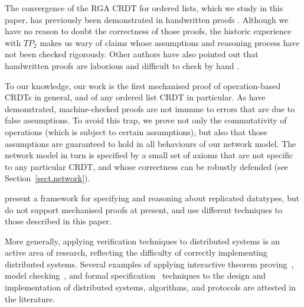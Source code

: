 The convergence of the RGA CRDT for ordered lists, which we study in this paper, has previously been
demonstrated in handwritten proofs \cite{Attiya:2016kh,Kleppmann:2016ve,Roh:2009ws}. Although we
have no reason to doubt the correctness of those proofs, the historic experience with
$\mathit{TP}_2$ makes us wary of claims whose assumptions and reasoning process have not been
checked rigorously. Other authors have also pointed out that handwritten proofs are laborious and
difficult to check by hand \cite{Li:2008hw,Li:2005jq}.

To our knowledge, our work is the first mechanised proof of operation-based CRDTs in general, and of
any ordered list CRDT in particular. As \citet{Oster:2005vi} have demonstrated, machine-checked
proofs are not immune to errors that are due to false assumptions. To avoid this trap, we prove not
only the commutativity of operations (which is subject to certain assumptions), but also that those
assumptions are guaranteed to hold in all behaviours of our network model. The network model in turn
is specified by a small set of axioms that are not specific to any particular CRDT, and whose
correctness can be robustly defended (see Section~\ref{sect.network}).

\citet{Burckhardt:2014ft} present a framework for specifying and reasoning about replicated datatypes, but do not support mechanised proofs at present, and use different techniques to those described in this paper.

More generally, applying verification techniques to distributed systems is an active area of research, reflecting the difficulty of correctly implementing distributed systems.
Several examples of applying interactive theorem proving~\cite{DBLP:conf/pldi/WilcoxWPTWEA15,DBLP:journals/afp/DebratM12,DBLP:conf/sss/Charron-BostDM11}, model checking~\cite{DBLP:conf/asm/AzmyMW16,DBLP:journals/entcs/JohnsonLLV04}, and formal specification~\cite{DBLP:journals/ijaacs/TounsiMM16,DBLP:conf/asm/AndriamiarinaMS14,DBLP:conf/wetice/TounsiMM13} techniques to the design and implementation of distributed systems, algorithms, and protocols are attested in the literature.
